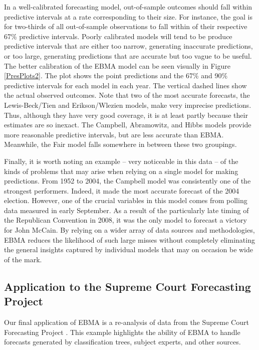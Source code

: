  In a well-calibrated forecasting model, out-of-sample outcomes should
 fall within predictive intervals at a rate corresponding to their
 size.  For instance, the goal is for two-thirds of all out-of-sample
 observations to fall within of their respective 67\% predictive
 intervals.  Poorly calibrated models will tend to be produce
 predictive intervals that are either too narrow, generating
 inaccurate predictions, or too large, generating predictions that are
 accurate but too vague to be useful.  The better calibration of the
 EBMA model can be seen visually in Figure \ref{PresPlots2}.  The plot
 shows the point predictions and the 67\% and 90\% predictive
 intervals for each model in each year.  The vertical dashed lines
 show the actual observed outcomes.  Note that two of the most
 accurate forecasts, the Lewis-Beck/Tien and Erikson/Wlezien models,
 make very imprecise predictions.  Thus, although they have very good
 coverage, it is at least partly because their estimates are so
 inexact.  The Campbell, Abramowitz, and Hibbs models provide more
 reasonable predictive intervals, but are less accurate than
 EBMA. Meanwhile, the Fair model falls somewhere in between these two
 groupings.


 Finally, it is worth noting an example -- very noticeable in this
 data -- of the kinds of problems that may arise when relying on a
 single model for making predictions.  From 1952 to 2004, the Campbell
 model was consistently one of the strongest performers.  Indeed, it
 made the most accurate forecast of the 2004 election.  However, one
 of the crucial variables in this model comes from polling data
 measured in early September.  As a result of the particularly late
 timing of the Republican Convention in 2008, it was the only model to
 forecast a victory for John McCain.  By relying on a wider array of
 data sources and methodologies, EBMA reduces the likelihood of such
 large misses without completely eliminating the general insights
 captured by individual models that may on occasion be wide of the
 mark.


\subsection{Application to the Supreme Court Forecasting Project}

Our final application of EBMA is a re-analysis of data from the
Supreme Court Forecasting Project \citep{Ruger:2004,
  Martin:2004}.
This example highlights the ability of EBMA to handle forecasts
generated by classification trees, subject experts, and other sources.

